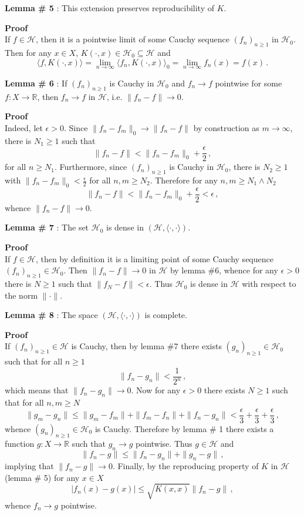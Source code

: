 \documentclass[a4paper]{article}
\newcommand{\Real}{\mathbb{R}}
\newcommand{\Hcal}{\mathcal{H}}
\begin{document}
\noindent\textbf{Lemma \# 5} : This extension preserves reproducibility of $K$.

\noindent\textbf{Proof} \hfill \\
If $f\in \Hcal$, then it is a pointwise limit of some Cauchy sequence $(f_n)_{n\geq1}$
in $\Hcal_0$. Then for any $x\in X$, $K(\cdot, x)\in \Hcal_0 \subseteq \Hcal$ and
\[
\langle f, K(\cdot, x)\rangle
= \lim_{n\to\infty} \langle f_n, K(\cdot, x)\rangle_0
= \lim_{n\to\infty} f_n(x)
= f(x)\,.
\]

\noindent\textbf{Lemma \# 6} : If $(f_n)_{n\geq1}$ is Cauchy in $\Hcal_0$ and $f_n\to f$
pointwise for some $f:X\to \Real$, then $f_n\to f$ in $\Hcal$, i.e. $\|f_n-f\|\to 0$.

\noindent\textbf{Proof} \hfill \\
Indeed, let $\epsilon>0$. Since $\|f_n-f_m\|_0 \to \|f_n-f\|$ by construction as
$m\to \infty$, there is $N_1\geq1$ such that
\[ \|f_n-f\| < \|f_n-f_m\|_0 + \frac{\epsilon}{2}\,, \]
for all $n\geq N_1$. Furthermore, since $(f_n)_{n\geq1}$ is Cauchy in $\Hcal_0$,
there is $N_2\geq1$ with $\|f_n-f_m\|_0 < \frac{\epsilon}{2}$ for all $n,m\geq N_2$.
Therefore for any $n,m\geq N_1\wedge N_2$
\[ \|f_n-f\| < \|f_n-f_m\|_0 + \frac{\epsilon}{2} < \epsilon \,, \]
whence $\|f_n-f\| \to 0$.

\noindent\textbf{Lemma \# 7} : The set $\Hcal_0$ is dense in $(\Hcal,\langle\cdot,\cdot\rangle)$.

\noindent\textbf{Proof} \hfill \\
If $f\in\Hcal$, then by definition it is a limiting point of some Cauchy sequence
$(f_n)_{n\geq1}\in\Hcal_0$. Then $\|f_n-f\|\to 0$ in $\Hcal$ by lemma \#6, whence
for any $\epsilon>0$ there is $N\geq1$ such that $\|f_N-f\|<\epsilon$. Thus $\Hcal_0$
is dense in $\Hcal$ with respect to the norm $\|\cdot\|$.

\noindent\textbf{Lemma \# 8} : The space $(\Hcal,\langle\cdot,\cdot\rangle)$ is complete.

\noindent\textbf{Proof} \hfill \\
If $(f_n)_{n\geq1}\in\Hcal$ is Cauchy, then by lemma \#7 there exists $(g_n)_{n\geq1}\in \Hcal_0$
such that for all $n\geq1$
\[ \|f_n - g_n\| < \frac{1}{2^n} \,, \]
which means that $\| f_n-g_n\|\to 0$.
Now for any $\epsilon>0$ there exists $N\geq1$ such that for all $n,m\geq N$
\[
\| g_m - g_n \|
\leq \| g_m - f_m \| + \| f_m - f_n \| + \| f_n - g_n \|
< \frac{\epsilon}{3} + \frac{\epsilon}{3} + \frac{\epsilon}{3} \,,
\]
whence $(g_n)_{n\geq1}\in \Hcal_0$ is Cauchy. Therefore by lemma \# 1 there exists
a function $g : X\to \Real$ such that $g_n\to g$ pointwise. Thus $g\in \Hcal$ and
\[ \|f_n - g\| \leq \|f_n - g_n\| + \|g_n - g\|\,, \]
implying that $\|f_n - g\| \to 0$. Finally, by the reproducing property of $K$
in $\Hcal$ (lemma \# 5) for any $x\in X$
\[ |f_n(x) - g(x) | \leq \sqrt{K(x,x)} \|f_n - g\|\,, \]
whence $f_n\to g$ pointwise.
\end{document}

